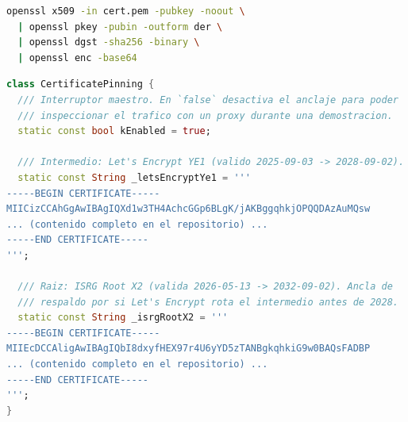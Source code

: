 \documentclass[12pt, a4paper]{article} %
\begin{document}
\begin{lstlisting}[language=bash, caption={Comando para recalcular la huella SPKI de un certificado}]
openssl x509 -in cert.pem -pubkey -noout \
  | openssl pkey -pubin -outform der \
  | openssl dgst -sha256 -binary \
  | openssl enc -base64
\end{lstlisting}

\begin{lstlisting}[language=Dart, caption={Interruptor maestro y anclas embebidas (extracto)}]
class CertificatePinning {
  /// Interruptor maestro. En `false` desactiva el anclaje para poder
  /// inspeccionar el trafico con un proxy durante una demostracion.
  static const bool kEnabled = true;

  /// Intermedio: Let's Encrypt YE1 (valido 2025-09-03 -> 2028-09-02).
  static const String _letsEncryptYe1 = '''
-----BEGIN CERTIFICATE-----
MIICizCCAhGgAwIBAgIQXd1w3TH4AchcGGp6BLgK/jAKBggqhkjOPQQDAzAuMQsw
... (contenido completo en el repositorio) ...
-----END CERTIFICATE-----
''';

  /// Raiz: ISRG Root X2 (valida 2026-05-13 -> 2032-09-02). Ancla de
  /// respaldo por si Let's Encrypt rota el intermedio antes de 2028.
  static const String _isrgRootX2 = '''
-----BEGIN CERTIFICATE-----
MIIEcDCCAligAwIBAgIQbI8dxyfHEX97r4U6yYD5zTANBgkqhkiG9w0BAQsFADBP
... (contenido completo en el repositorio) ...
-----END CERTIFICATE-----
''';
}
\end{lstlisting}
\end{document}
